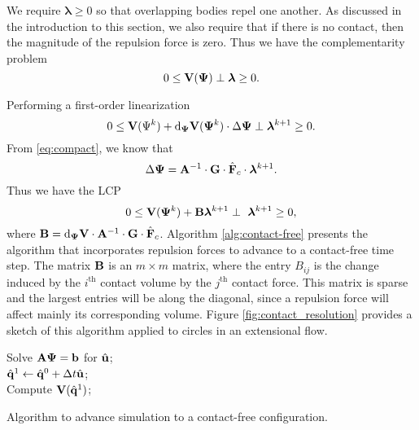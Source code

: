 We require $\bm{\lambda}\geq 0$ so that overlapping bodies repel one another. As discussed in the introduction to this section, we also require that if there is no contact, then the magnitude of the repulsion force is zero. Thus we have the complementarity problem
\begin{equation}\label{eq:ncp_mobility}0 \leq  {\mathbf{V}}(\bm{\Psi}) \perp \bm{\lambda} \geq 0.\end{equation}

Performing a first-order linearization
\[ 0 \leq {\mathbf{V}}(\Psi^k) + \text{d}_{\bm{\Psi}}{\mathbf{V}}(\bm{\Psi}^k)\cdot\Delta \bm{\Psi} \perp \bm{\lambda}^{k+1} \geq 0.\]
From \eqref{eq:compact}, we know that
\[ \Delta\bm{\Psi} = \mathbf{A}^{-1}\cdot\mathbf{G}\cdot\hat{{\mathbf{F}}}_c\cdot\bm{\lambda}^{k+1}.\]
Thus we have the LCP
\begin{equation}\label{eq:lcp_repulsion} 0 \leq {\mathbf{V}}(\bm{\Psi}^k) + {\mathbf{B}}\bm{\lambda}^{k+1} \perp\ \bm{\lambda}^{k+1} \geq 0,\end{equation}
where ${\mathbf{B}} = \text{d}_{\bm{\Psi}}{\mathbf{V}} \cdot\mathbf{A}^{-1}\cdot \mathbf{G} \cdot \hat{{\mathbf{F}}}_c$. Algorithm \ref{alg:contact-free} presents the algorithm that incorporates repulsion forces to advance to a contact-free time step. The matrix ${\mathbf{B}}$ is an $m\times m$ matrix, where the entry $B_{ij}$ is the change induced by the $i^\text{th}$ contact volume by the $j^\text{th}$ contact force. This matrix is sparse and the largest entries will be along the diagonal, since a repulsion force will affect mainly its corresponding volume. Figure \ref{fig:contact_resolution} provides a sketch of this algorithm applied to circles in an extensional flow. 

\begin{algorithm}[!h]
Solve $\mathbf{A} \bm{\Psi} = {\mathbf{b}}$ for $\hat{{\mathbf{u}}}$;\\
$\hat{{\mathbf{q}}}^1 \gets \hat{{\mathbf{q}}}^0 + \Delta t\hat{{\mathbf{u}}}$; \\
Compute ${\mathbf{V}}(\hat{{\mathbf{q}}}^1)$;\\
	\caption{Algorithm to advance simulation to a contact-free configuration.}\label{alg:contact-free}	
\end{algorithm}


